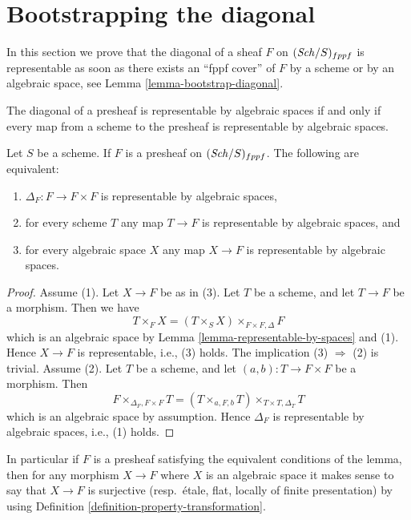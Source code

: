 \section{Bootstrapping the diagonal}
\label{section-bootstrap-diagonal}

\noindent
In this section we prove that the diagonal of a sheaf $F$ on
$(\mathit{Sch}/S)_{fppf}$ is representable as soon as there exists
an ``fppf cover'' of $F$ by a scheme or by an algebraic space, see
Lemma \ref{lemma-bootstrap-diagonal}.

\begin{lemma}
\label{lemma-representable-diagonal}
\begin{slogan}
The diagonal of a presheaf is representable by algebraic spaces if and only if
every map from a scheme to the presheaf is representable by algebraic spaces.
\end{slogan}
Let $S$ be a scheme.
If $F$ is a presheaf on $(\mathit{Sch}/S)_{fppf}$.
The following are equivalent:
\begin{enumerate}
\item $\Delta_F : F \to F \times F$ is representable by algebraic spaces,
\item for every scheme $T$ any map $T \to F$ is representable by algebraic
spaces, and
\item for every algebraic space $X$ any map $X \to F$ is representable
by algebraic spaces.
\end{enumerate}
\end{lemma}

\begin{proof}
Assume (1). Let $X \to F$ be as in (3). Let $T$ be a scheme, and let
$T \to F$ be a morphism. Then we have
$$
T \times_F X = (T \times_S X) \times_{F \times F, \Delta} F
$$
which is an algebraic space by
Lemma \ref{lemma-representable-by-spaces}
and (1). Hence $X \to F$ is representable, i.e., (3) holds.
The implication (3) $\Rightarrow$ (2) is trivial. Assume (2).
Let $T$ be a scheme, and let $(a, b) : T \to F \times F$ be a morphism.
Then
$$
F \times_{\Delta_F, F \times F} T =
(T \times_{a, F, b} T) \times_{T \times T, \Delta_T} T
$$
which is an algebraic space by assumption. Hence $\Delta_F$ is
representable by algebraic spaces, i.e., (1) holds.
\end{proof}

\noindent
In particular if $F$ is a presheaf satisfying the equivalent conditions of
the lemma, then for any morphism $X \to F$ where $X$ is an algebraic space
it makes sense to say that $X \to F$ is surjective (resp.\ \'etale, flat,
locally of finite presentation) by using
Definition \ref{definition-property-transformation}.

